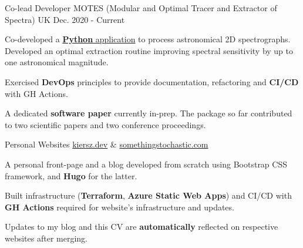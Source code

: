 
\begin{cventries}

  \cventry
    {Co-lead Developer} %
    {MOTES (Modular and Optimal Tracer and Extractor of Spectra)} %
    {UK} %
    {Dec. 2020 - Current} %
    {
      \begin{cvitems} %
        \item Co-developed a \href{https://github.com/tseccull/motes}{\textbf{Python} application} to process astronomical 2D spectrographs. Developed an optimal extraction routine improving spectral sensitivity by up to one astronomical magnitude.
        \item Exercised \textbf{DevOps} principles to provide documentation, refactoring and\textbf{ CI/CD} with GH Actions.
        \item A dedicated \textbf{software paper} currently in-prep. The package so far contributed to two scientific papers and two conference proceedings.
      \end{cvitems}
    }





   \cventry
   	{Personal Websites}
  	{\href{https://kiersz.dev/}{kiersz.dev} \& \href{https://somethingstochastic.com/}{somethingstochastic.com}}
    {} %
    {} %
   	{
   	   	\begin{cvitems} 
   	    \item A personal front-page and a blog developed from scratch using Bootstrap CSS framework, and \textbf{Hugo} for the latter.
   	    \item Built infrastructure (\textbf{Terraform}, \textbf{Azure Static Web Apps}) and CI/CD with \textbf{GH Actions} required for website's infrastructure and updates. 
   	    \item Updates to my blog and this CV are \textbf{automatically} reflected on respective websites after merging.
   	    \end{cvitems}
   	}
   	

\end{cventries}
